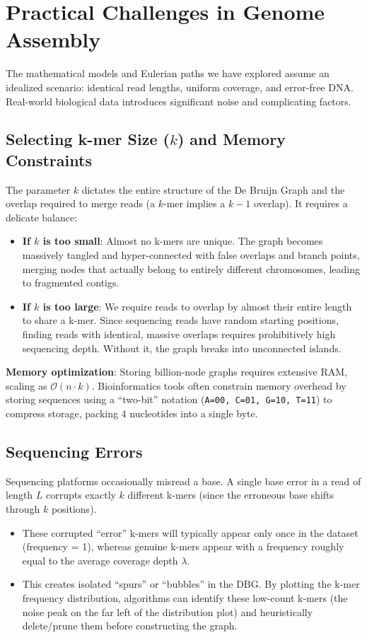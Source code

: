 \section{Practical Challenges in Genome Assembly}

The mathematical models and Eulerian paths we have explored assume an idealized scenario: identical read lengths, uniform coverage, and error-free DNA. Real-world biological data introduces significant noise and complicating factors.

\subsection{Selecting k-mer Size (\texorpdfstring{$k$}{k}) and Memory Constraints}
The parameter $k$ dictates the entire structure of the De Bruijn Graph and the overlap required to merge reads (a $k$-mer implies a $k-1$ overlap). It requires a delicate balance:
\begin{itemize}
    \item \textbf{If $k$ is too small}: Almost no k-mers are unique. The graph becomes massively tangled and hyper-connected with false overlaps and branch points, merging nodes that actually belong to entirely different chromosomes, leading to fragmented contigs.
    \item \textbf{If $k$ is too large}: We require reads to overlap by almost their entire length to share a k-mer. Since sequencing reads have random starting positions, finding reads with identical, massive overlaps requires prohibitively high sequencing depth. Without it, the graph breaks into unconnected islands.
\end{itemize}
\sta \textbf{Memory optimization}: Storing billion-node graphs requires extensive RAM, scaling as $\mathcal{O}(n \cdot k)$. Bioinformatics tools often constrain memory overhead by storing sequences using a ``two-bit'' notation (\texttt{A=00, C=01, G=10, T=11}) to compress storage, packing 4 nucleotides into a single byte.

\subsection{Sequencing Errors}
Sequencing platforms occasionally misread a base. A single base error in a read of length $L$ corrupts exactly $k$ different k-mers (since the erroneous base shifts through $k$ positions).
\begin{itemize}
    \item These corrupted ``error'' k-mers will typically appear only once in the dataset (frequency = 1), whereas genuine k-mers appear with a frequency roughly equal to the average coverage depth $\lambda$.
    \item This creates isolated ``spurs'' or ``bubbles'' in the DBG. By plotting the k-mer frequency distribution, algorithms can identify these low-count k-mers (the noise peak on the far left of the distribution plot) and heuristically delete/prune them before constructing the graph.
\end{itemize}

